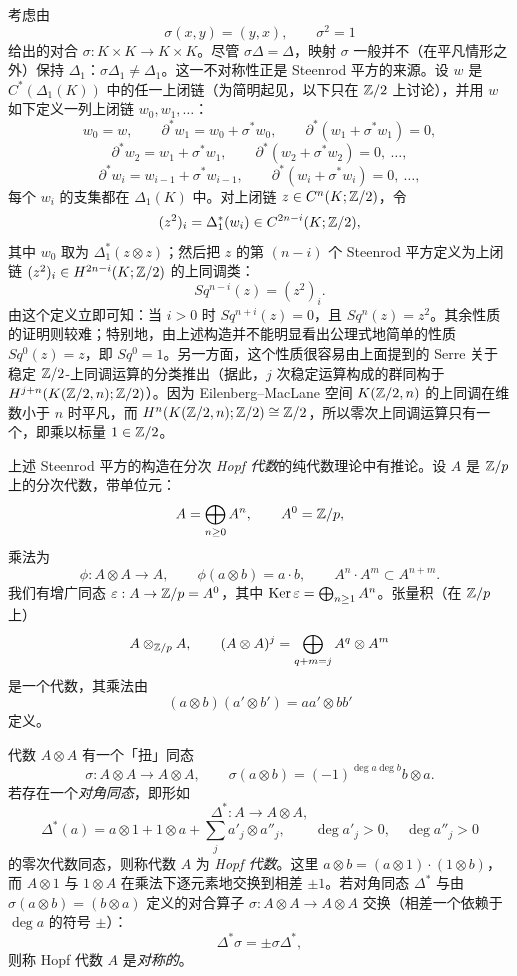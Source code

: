 考虑由
\[
\sigma(x,y)=(y,x),\qquad\sigma^2=1
\]
给出的对合 $\sigma:K\times K\to K\times K$。尽管 $\sigma\Delta=\Delta$，映射 $\sigma$ 一般并不（在平凡情形之外）保持 $\Delta_1$：$\sigma\Delta_1\ne\Delta_1$。这一不对称性正是 Steenrod 平方的来源。设 $w$ 是 $C^*(\Delta_1(K))$ 中的任一上闭链（为简明起见，以下只在 $\mathbb{Z}/2$ 上讨论），并用 $w$ 如下定义一列上闭链 $w_0,w_1,\dots$：
\[
w_0=w,\qquad \partial^*w_1=w_0+\sigma^*w_0,\qquad \partial^*(w_1+\sigma^*w_1)=0,
\]
\[
\partial^*w_2=w_1+\sigma^*w_1,\qquad \partial^*(w_2+\sigma^*w_2)=0,\ \dots,
\]
\[
\partial^*w_i=w_{i-1}+\sigma^*w_{i-1},\qquad \partial^*(w_i+\sigma^*w_i)=0,\ \dots,
\]
每个 $w_i$ 的支集都在 $\Delta_1(K)$ 中。对上闭链 $z\in C^n(K;\mathbb{Z}/2)$，令
\[
(z^2)_i=\Delta_1^*(w_i)\in C^{2n-i}(K;\mathbb{Z}/2),
\]
其中 $w_0$ 取为 $\Delta_1^*(z\otimes z)$；然后把 $z$ 的第 $(n-i)$ 个 Steenrod 平方定义为上闭链 $(z^2)_i\in H^{2n-i}(K;\mathbb{Z}/2)$ 的上同调类：
\[
Sq^{n-i}(z)=(z^2)_i.
\]
由这个定义立即可知：当 $i>0$ 时 $Sq^{n+i}(z)=0$，且 $Sq^n(z)=z^2$。其余性质的证明则较难；特别地，由上述构造并不能明显看出公理式地简单的性质 $Sq^0(z)=z$，即 $Sq^0=1$。另一方面，这个性质很容易由上面提到的 Serre 关于稳定 $\mathbb{Z}/2$-上同调运算的分类推出（据此，$j$ 次稳定运算构成的群同构于 $H^{j+n}(K(\mathbb{Z}/2,n);\mathbb{Z}/2)$）。因为 Eilenberg--MacLane 空间 $K(\mathbb{Z}/2,n)$ 的上同调在维数小于 $n$ 时平凡，而 $H^n(K(\mathbb{Z}/2,n);\mathbb{Z}/2)\cong\mathbb{Z}/2$，所以零次上同调运算只有一个，即乘以标量 $1\in\mathbb{Z}/2$。


上述 Steenrod 平方的构造在分次 \emph{Hopf 代数}的纯代数理论中有推论。设 $A$ 是 $\mathbb{Z}/p$ 上的分次代数，带单位元：
\[
A=\bigoplus_{n\ge0}A^n,\qquad A^0=\mathbb{Z}/p,
\]
乘法为
\[
\phi:A\otimes A\longrightarrow A,\qquad \phi(a\otimes b)=a\cdot b,\qquad A^n\cdot A^m\subset A^{n+m}.
\]
我们有增广同态 $\varepsilon:A\to\mathbb{Z}/p=A^0$，其中 $\operatorname{Ker}\varepsilon=\bigoplus_{n\ge1}A^n$。张量积（在 $\mathbb{Z}/p$ 上）
\[
A\otimes_{\mathbb{Z}/p}A,\qquad (A\otimes A)^j=\bigoplus_{q+m=j}A^q\otimes A^m
\]
是一个代数，其乘法由
\[
(a\otimes b)(a'\otimes b')=aa'\otimes bb'
\]
定义。

代数 $A\otimes A$ 有一个「扭」同态
\[
\sigma:A\otimes A\longrightarrow A\otimes A,\qquad \sigma(a\otimes b)=(-1)^{\deg a\deg b}b\otimes a.
\]
若存在一个\emph{对角同态}，即形如
\[
\Delta^*:A\longrightarrow A\otimes A,
\]
\[
\Delta^*(a)=a\otimes1+1\otimes a+\sum_j a'_j\otimes a''_j,\qquad \deg a'_j>0,\quad \deg a''_j>0
\]
的零次代数同态，则称代数 $A$ 为 \emph{Hopf 代数}。这里 $a\otimes b=(a\otimes1)\cdot(1\otimes b)$，而 $A\otimes1$ 与 $1\otimes A$ 在乘法下逐元素地交换到相差 $\pm1$。若对角同态 $\Delta^*$ 与由 $\sigma(a\otimes b)=(b\otimes a)$ 定义的对合算子 $\sigma:A\otimes A\to A\otimes A$ 交换（相差一个依赖于 $\deg a$ 的符号 $\pm$）：
\[
\Delta^*\sigma=\pm\sigma\Delta^*,
\]
则称 Hopf 代数 $A$ 是\emph{对称的}。

